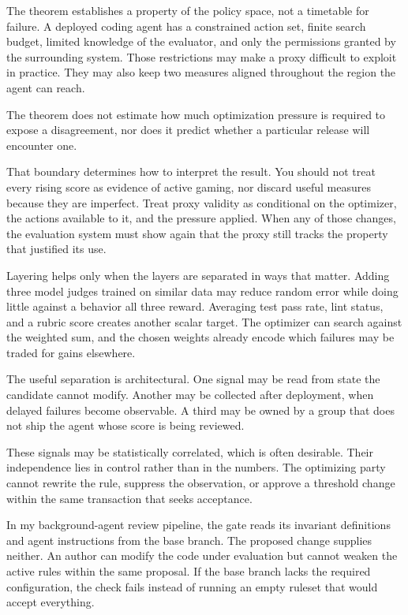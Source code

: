 The theorem establishes a property of the policy space, not a timetable for failure. A deployed coding agent has a constrained action set, finite search budget, limited knowledge of the evaluator, and only the permissions granted by the surrounding system. Those restrictions may make a proxy difficult to exploit in practice. They may also keep two measures aligned throughout the region the agent can reach.

The theorem does not estimate how much optimization pressure is required to expose a disagreement, nor does it predict whether a particular release will encounter one.

That boundary determines how to interpret the result. You should not treat every rising score as evidence of active gaming, nor discard useful measures because they are imperfect. Treat proxy validity as conditional on the optimizer, the actions available to it, and the pressure applied. When any of those changes, the evaluation system must show again that the proxy still tracks the property that justified its use.

Layering helps only when the layers are separated in ways that matter. Adding three model judges trained on similar data may reduce random error while doing little against a behavior all three reward. Averaging test pass rate, lint status, and a rubric score creates another scalar target. The optimizer can search against the weighted sum, and the chosen weights already encode which failures may be traded for gains elsewhere.

The useful separation is architectural. One signal may be read from state the candidate cannot modify. Another may be collected after deployment, when delayed failures become observable. A third may be owned by a group that does not ship the agent whose score is being reviewed.

These signals may be statistically correlated, which is often desirable. Their independence lies in control rather than in the numbers. The optimizing party cannot rewrite the rule, suppress the observation, or approve a threshold change within the same transaction that seeks acceptance.

In my background-agent review pipeline, the gate reads its invariant definitions and agent instructions from the base branch. The proposed change supplies neither. An author can modify the code under evaluation but cannot weaken the active rules within the same proposal. If the base branch lacks the required configuration, the check fails instead of running an empty ruleset that would accept everything.

